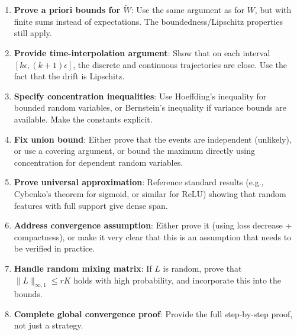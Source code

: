 \begin{enumerate}
\item \textbf{Prove a priori bounds for $\tilde{W}$}: Use the same argument as for $W$, but with finite sums instead of expectations. The boundedness/Lipschitz properties still apply.

\item \textbf{Provide time-interpolation argument}: Show that on each interval $[k\epsilon, (k+1)\epsilon]$, the discrete and continuous trajectories are close. Use the fact that the drift is Lipschitz.

\item \textbf{Specify concentration inequalities}: Use Hoeffding's inequality for bounded random variables, or Bernstein's inequality if variance bounds are available. Make the constants explicit.

\item \textbf{Fix union bound}: Either prove that the events are independent (unlikely), or use a covering argument, or bound the maximum directly using concentration for dependent random variables.

\item \textbf{Prove universal approximation}: Reference standard results (e.g., Cybenko's theorem for sigmoid, or similar for ReLU) showing that random features with full support give dense span.

\item \textbf{Address convergence assumption}: Either prove it (using loss decrease + compactness), or make it very clear that this is an assumption that needs to be verified in practice.

\item \textbf{Handle random mixing matrix}: If $L$ is random, prove that $\|L\|_{\infty,1} \le rK$ holds with high probability, and incorporate this into the bounds.

\item \textbf{Complete global convergence proof}: Provide the full step-by-step proof, not just a strategy.
\end{enumerate}
